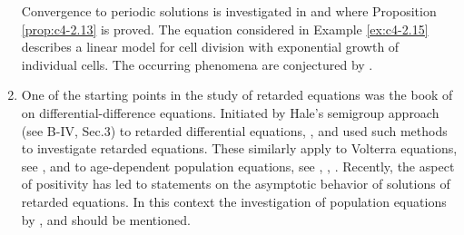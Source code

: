 \begin{enumerate}[label=\emph{Section \arabic*:}, wide, itemsep=1ex]
Convergence to periodic solutions is investigated in \citet{kerschernagel:1984} and \citet{nagel:1984} where Proposition \ref{prop:c4-2.13} is proved.
The equation considered in Example \ref{ex:c4-2.15} describes a linear model for cell division with exponential growth of individual cells.
The occurring phenomena are conjectured by \citet{diekmannetal:1984}.

\item%
One of the starting points in the study of retarded equations was the book of \citet{bellmancooke:1963} on differential-difference equations.
Initiated by Hale's semigroup approach (see B-IV, Sec.3) to retarded differential equations, \citet{dysonvillella:1979}, \citet{villellabressan:1985} and \citet{webb:1977} used such methods to investigate retarded equations.
These similarly apply to Volterra equations, see \citet{miller:1974}, \citet{webb:1977} and to age-dependent population equations, see \citet{Pruess:1981}, \citet{webb:1984}, \citet{webb:1985a}.
Recently, the aspect of positivity has led to statements on the asymptotic behavior of solutions of retarded equations.
In this context the investigation of population equations by \citet{greiner:1984}, \citet{heijmans:1985a} and \citet{webb:1985b} should be mentioned.

\end{enumerate}

\begin{comment}
\section*{References}
\addcontentsline{toc}{section}{References}
{\RaggedRight
\renewcommand{\bibsection}{}

}
\end{comment}
